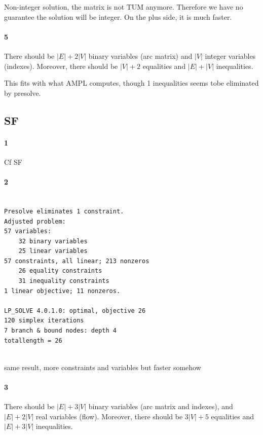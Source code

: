 \documentclass{article}
\begin{document}
Non-integer solution, the matrix is not TUM anymore. Therefore we have no guarantee the solution will be integer.
On the plus side, it is much faster.

\paragraph{5}

There should be $|E|+2|V|$ binary variables (arc matrix) and $|V|$ integer variables (indexes). Moreover, there should be $|V|+2$ equalities and $|E|+|V|$ inequalities.

This fits with what AMPL computes, though 1 inequalities seems tobe eliminated by presolve.

\subsection{SF}

\paragraph{1}

Cf SF

\paragraph{2}

\begin{lstlisting}

Presolve eliminates 1 constraint.
Adjusted problem:
57 variables:
	32 binary variables
	25 linear variables
57 constraints, all linear; 213 nonzeros
	26 equality constraints
	31 inequality constraints
1 linear objective; 11 nonzeros.

LP_SOLVE 4.0.1.0: optimal, objective 26
120 simplex iterations
7 branch & bound nodes: depth 4
totallength = 26
  
\end{lstlisting}

same result, more constraints and variables but faster somehow

\paragraph{3}

There should be $|E|+3|V|$ binary variables (arc matrix and indexes), and $|E|+2|V|$ real variables (flow). Moreover, there should be $3|V|+5$ equalities and $|E|+3|V|$ inequalities.
\end{document}
